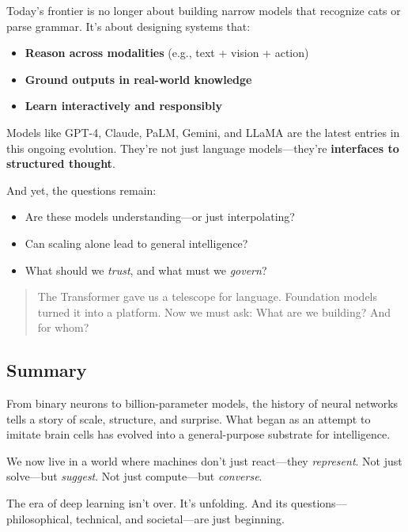 Today’s frontier is no longer about building narrow models that recognize cats or parse grammar. It’s about designing systems that:

\begin{itemize}
  \item \textbf{Reason across modalities} (e.g., text + vision + action)
  \item \textbf{Ground outputs in real-world knowledge}
  \item \textbf{Learn interactively and responsibly}
\end{itemize}

Models like GPT-4, Claude, PaLM, Gemini, and LLaMA are the latest entries in this ongoing evolution. They’re not just language models—they’re \textbf{interfaces to structured thought}.

And yet, the questions remain:

\begin{itemize}
  \item Are these models understanding—or just interpolating?
  \item Can scaling alone lead to general intelligence?
  \item What should we \emph{trust}, and what must we \emph{govern}?
\end{itemize}

\begin{quote}
The Transformer gave us a telescope for language.  
Foundation models turned it into a platform.  
Now we must ask: What are we building? And for whom?
\end{quote}

\subsection{Summary}

From binary neurons to billion-parameter models, the history of neural networks tells a story of scale, structure, and surprise. What began as an attempt to imitate brain cells has evolved into a general-purpose substrate for intelligence.

We now live in a world where machines don't just react—they \emph{represent}.  
Not just solve—but \emph{suggest}.  
Not just compute—but \emph{converse}.

The era of deep learning isn’t over. It’s unfolding.
And its questions—philosophical, technical, and societal—are just beginning.

